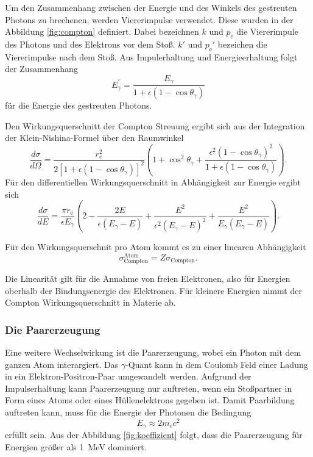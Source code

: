 Um den Zusammenhang zwischen der Energie und des Winkels des gestreuten Photons
zu brechenen, werden Viererimpulse verwendet. Diese wurden in der Abbildung \ref{fig:compton} definiert.
Dabei bezeichnen $k$ und $p_{\text{e}}$ die Viererimpule des Photons und des Elektrons vor dem Stoß.
$k'$ und $p_{\text{e}}'$ bezeichen die Viererimpulse nach dem Stoß.
Aus Impulerhaltung und Energieerhaltung folgt der Zusammenhang
\begin{equation}
    E_\gamma^{\prime}=\frac{E_\gamma}{1+\epsilon\left(1-\cos \theta_\gamma\right)}
    \label{eqn:Energie_comptonstreuung}
\end{equation}
für die Energie des gestreuten Photons.

Den Wirkungsquerschnitt der Compton Streuung ergibt sich aus der Integration der Klein-Nishina-Formel über den Raumwinkel
\begin{equation}
    \frac{d \sigma}{d \Omega}=\frac{r_e^2}{2\left[1+\epsilon\left(1-\cos \theta_\gamma\right)\right]^2}\left(1+\cos ^2 \theta_\gamma+\frac{\epsilon^2\left(1-\cos \theta_\gamma\right)^2}{1+\epsilon\left(1-\cos \theta_\gamma\right)}\right).
\end{equation}
Für den differentiellen Wirkungsquerschnitt in Abhängigkeit zur Energie ergibt sich 
\begin{equation}
    \frac{d \sigma}{d E} = \frac{\pi r_{\text{e}}}{\epsilon E_\gamma} \left(2 - \frac{2 E}{\epsilon \left(E_\gamma - E \right)}+ \frac{E^2}{\epsilon^2 \left(E_\gamma - E \right)^2} + \frac{E^2}{E_\gamma \left(E_\gamma - E \right)}\right).
    \label{eqn:Wirkungsquerschnitt}
\end{equation}

Für den Wirkungsquerschnit pro Atom kommt es zu einer linearen Abhängigkeit
\begin{equation}
    \sigma_{\text{Compton}}^{\text{Atom}}=Z \sigma_{\text{Compton}}.
\end{equation}

Die Linearität gilt für die Annahme von freien Elektronen, also für Energien oberhalb der
Bindungsenergie des Elektronen.
Für kleinere Energien nimmt der Compton Wirkungsquerschnitt in Materie ab.

\subsubsection{Die Paarerzeugung}
\label{paarerzeugung}

Eine weitere Wechselwirkung ist die Paarerzeugung, wobei ein Photon mit dem ganzen Atom interargiert.
Das $\gamma$-Quant kann in dem Coulomb Feld einer Ladung in ein Elektron-Positron-Paar umgewandelt werden.
Aufgrund der Impulserhaltung kann Paarerzeugung nur auftreten, wenn ein Stoßpartner in Form eines Atoms oder eines Hüllenelektrons
gegeben ist.
Damit Paarbildung auftreten kann, muss für die Energie der Photonen die Bedingung 
\begin{equation}
    E_\gamma \approx 2 m_e c^2
\end{equation}
erfüllt sein. 
Aus der Abbildung \ref{fig:koeffizient} folgt, dass die Paarerzeugung für Energien größer als \qty{1}{\mega\eV} dominiert.

